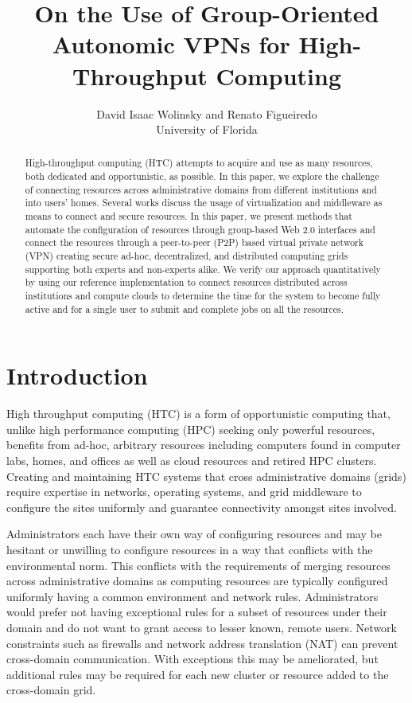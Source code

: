 \documentclass{sig-alternate}
\begin{document}
\title{On the Use of Group-Oriented Autonomic VPNs for High-Throughput Computing}

\author{
David Isaac Wolinsky and Renato Figueiredo
\\
University of Florida
\\
}

\maketitle

\begin{abstract}
High-throughput computing (HTC) attempts to acquire and use as many resources,
both dedicated and opportunistic, as possible.  In this paper, we explore the
challenge of connecting resources across administrative domains from different
institutions and into users' homes.  Several works discuss the usage of
virtualization and middleware as means to connect and secure resources.  In
this paper, we present methods that automate the configuration of resources
through group-based Web 2.0 interfaces and connect the resources through a
peer-to-peer (P2P) based virtual private network (VPN) creating secure ad-hoc,
decentralized, and distributed computing grids supporting both experts and
non-experts alike.  We verify our approach quantitatively by using our
reference implementation to connect resources distributed across institutions
and compute clouds to determine the time for the system to become fully active
and for a single user to submit and complete jobs on all the resources.
\end{abstract}

\section{Introduction}
High throughput computing (HTC) is a form of opportunistic computing that,
unlike high performance computing (HPC) seeking only powerful resources,
benefits from ad-hoc, arbitrary resources including computers found in computer
labs, homes, and offices as well as cloud resources and retired HPC clusters.
Creating and maintaining HTC systems that cross administrative domains (grids)
require expertise in networks, operating systems, and grid middleware to
configure the sites uniformly and guarantee connectivity amongst sites involved.

Administrators each have their own way of configuring resources and may be
hesitant or unwilling to configure resources in a way that conflicts with the
environmental norm.  This conflicts with the requirements of merging resources
across administrative domains as computing resources are typically configured
uniformly having a common environment and network rules.  Administrators would
prefer not having exceptional rules for a subset of resources under their
domain and do not want to grant access to lesser known, remote users.  Network
constraints such as firewalls and network address translation (NAT) can prevent
cross-domain communication.  With exceptions this may be ameliorated, but
additional rules may be required for each new cluster or resource added to the
cross-domain grid.
\end{document}
